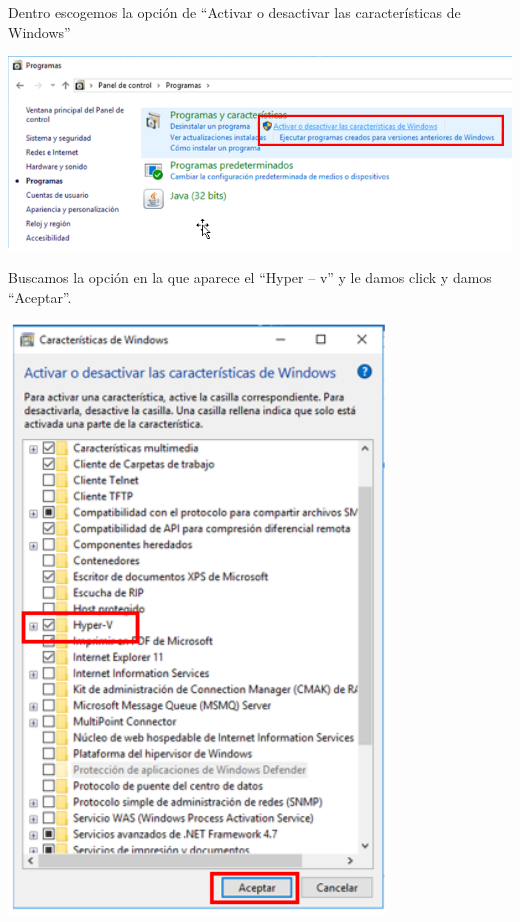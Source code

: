  \vspace{\baselineskip}
 
 Dentro escogemos la opción de “Activar o desactivar las características de Windows”
   	\begin{center}
 	\includegraphics[width=15cm]{./Imagenes/4} 
 	\end{center}
 
 \vspace{\baselineskip}
 
 Buscamos la opción en la que aparece el “Hyper – v” y le damos click y damos “Aceptar”.
    \begin{center}
 	\includegraphics[width=10cm]{./Imagenes/5} 
    \end{center}


